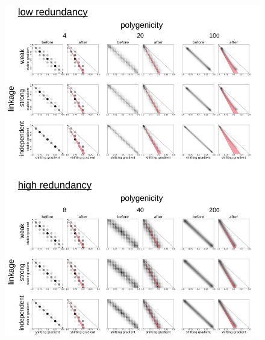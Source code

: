\documentclass[9pt,twocolumn,twoside,lineno]{pnas-new}
\begin{document}
\begin{figure}
\centering
\includegraphics[width=15.8cm]{pub/figs/FIG_4_phenotypic_shift.jpg}

\end{figure}
\end{document}
